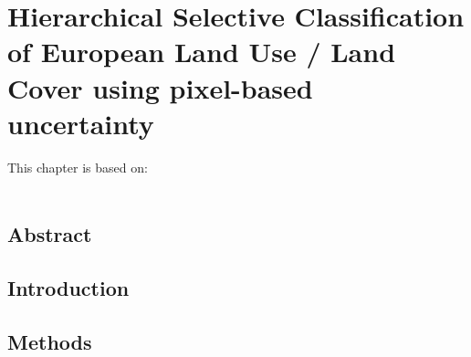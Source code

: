 \chapter[Hierarchical Selective Classification of European Land Use / Land Cover using pixel-based uncertainty]{Hierarchical Selective Classification of European Land Use / Land Cover using pixel-based uncertainty}
\label{cha:chapter4}
\vspace*{\fill}
This chapter is based on:
\\
\\
\newpage

\section*{Abstract}


\newpage

\section{Introduction}

\section{Methods}

